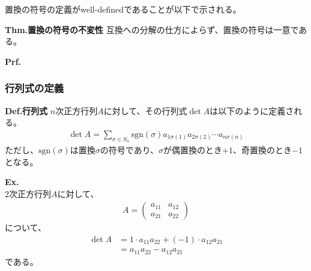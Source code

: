\documentclass[a4paper,11pt]{jsarticle}
\numberwithin{equation}{section}
\begin{document}
置換の符号の定義がwell-definedであることが以下で示される。\\
\begin{itembox}[l]{\textbf{Thm.置換の符号の不変性}}
  互換への分解の仕方によらず、置換の符号は一意である。
\end{itembox}
\textbf{Prf.}\\


\subsubsection{行列式の定義}
\begin{itembox}[l]{\textbf{Def.行列式}}
  $n$次正方行列$A$に対して、その行列式$\det A$は以下のように定義される。
  \begin{align}
    \det A = \sum_{\sigma \in S_n} \text{sgn}(\sigma) a_{1\sigma(1)}a_{2\sigma(2)}\cdots a_{n\sigma(n)}
  \end{align}
  ただし、$\text{sgn}(\sigma)$は置換$\sigma$の符号であり、$\sigma$が偶置換のとき$+1$、奇置換のとき$-1$となる。
\end{itembox}
\textbf{Ex.}\\
$2$次正方行列$A$に対して、
\begin{align}
  A = \begin{pmatrix}
    a_{11} & a_{12}\\
    a_{21} & a_{22}
  \end{pmatrix}
\end{align}
について、
\begin{align}
  \det A &= 1 \cdot a_{11}a_{22} + (-1) \cdot a_{12}a_{21}\\
  &= a_{11}a_{22} - a_{12}a_{21}
\end{align}
である。\\
\end{document}
